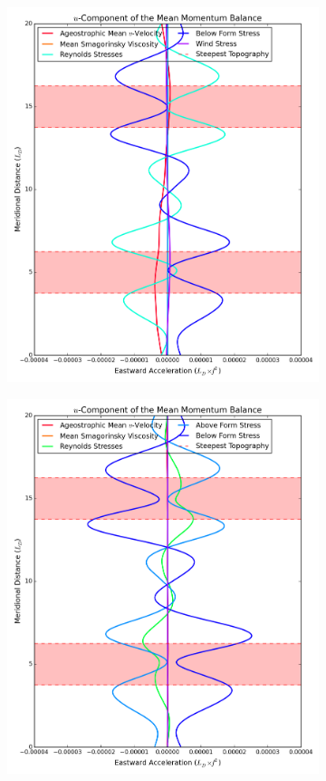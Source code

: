 \documentclass[12pt,a4paper]{report}
\begin{document}
 
 \begin{figure}
 	\centering
 	\begin{subfigure}{0.48\linewidth}
 		\centering
 		\caption{}
 		\includegraphics[width=\linewidth ]{umom_3}
 		\label{fig:umomlayer3}
 	\end{subfigure}
 	\quad
 	\begin{subfigure}{0.48\linewidth}
 		\centering
 		\caption{}
 		\includegraphics[width=\linewidth ]{umom_2}

\end{subfigure}
\end{figure}
\end{document}
